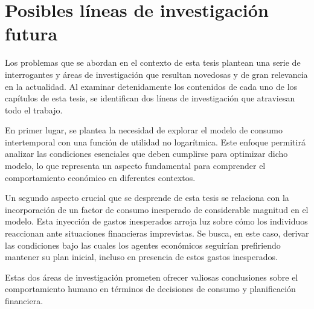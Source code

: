 \chapter*{Posibles líneas de investigación futura}

Los problemas que se abordan en el contexto de esta tesis plantean una serie de interrogantes y áreas de investigación que resultan novedosas y de gran relevancia en la actualidad. Al examinar detenidamente los contenidos de cada uno de los capítulos de esta tesis, se identifican dos líneas de investigación que atraviesan todo el trabajo.

En primer lugar, se plantea la necesidad de explorar el modelo de consumo intertemporal con una función de utilidad no logarítmica. Este enfoque permitirá analizar las condiciones esenciales que deben cumplirse para optimizar dicho modelo, lo que representa un aspecto fundamental para comprender el comportamiento económico en diferentes contextos.

Un segundo aspecto crucial que se desprende de esta tesis se relaciona con la incorporación de un factor de consumo inesperado de considerable magnitud en el modelo. Esta inyección de gastos inesperados arroja luz sobre cómo los individuos reaccionan ante situaciones financieras imprevistas. Se busca, en este caso, derivar las condiciones bajo las cuales los agentes económicos seguirían prefiriendo mantener su plan inicial, incluso en presencia de estos gastos inesperados.

Estas dos áreas de investigación prometen ofrecer valiosas conclusiones sobre el comportamiento humano en términos de decisiones de consumo y planificación financiera. 


   

